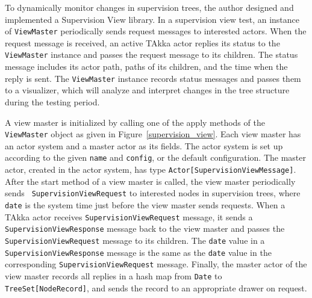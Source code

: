 To dynamically monitor changes in supervision trees, the author designed and 
implemented a Supervision View library. In a supervision view test, an instance 
of {\tt ViewMaster} periodically sends request messages to interested actors.  
When the request message is received, an active TAkka actor replies its 
status to the {\tt ViewMaster} instance and passes the request message to its 
children.  The status message includes its actor path, paths of its children, 
and the time when the reply is sent.  The {\tt ViewMaster} instance records 
status messages and passes them to a visualizer, which will analyze and 
interpret changes in the tree structure during the testing period.


A view master is initialized by calling one of the apply methods of the {\tt 
ViewMaster} object as given in Figure~\ref{supervision_view}.
Each view master has an actor system and a master actor as its fields.  The 
actor system is set up according to the given {\tt name} and {\tt config}, or 
the default configuration.  The master actor, created in the actor system, has 
type {\tt Actor[SupervisionViewMessage]}.  After the start method of a 
view master is called, the view master periodically sends {\tt 
SupervisionViewRequest} to interested nodes in supervision trees, where 
{\tt date} is the system time just before the view master sends requests.  
When a TAkka actor receives {\tt SupervisionViewRequest} message, it sends a 
{\tt SupervisionViewResponse} message back to the view master and passes the \\ 
{\tt SupervisionViewRequest} message to its children.  The {\tt date} value
in a \\ {\tt SupervisionViewResponse} message is the same as the {\tt date} 
value 
in the corresponding {\tt SupervisionViewRequest} message.  Finally, the master 
actor of the view master records all replies in a hash map from {\tt Date} to 
{\tt TreeSet[NodeRecord]}, and sends the record to an appropriate drawer on 
request. 

